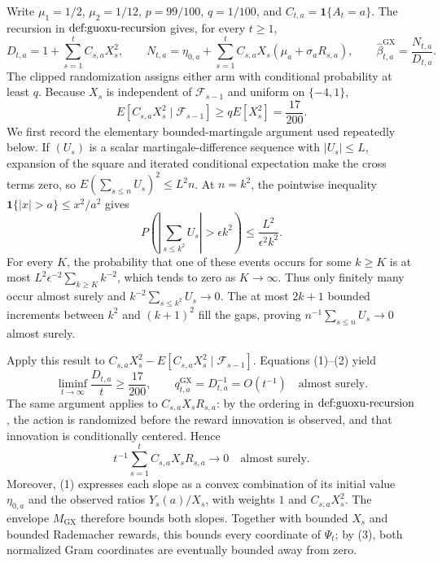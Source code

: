 Write \(\mu_1=1/2\), \(\mu_2=1/12\), \(p=99/100\), \(q=1/100\), and \(C_{t,a}=\mathbf 1\{A_t=a\}\).  The recursion in \(\textnormal{def:guoxu-recursion}\) gives, for every \(t\geq 1\),
\[
 D_{t,a}=1+\sum_{s=1}^t C_{s,a}X_s^2,\qquad
 N_{t,a}=\eta_{0,a}+\sum_{s=1}^t C_{s,a}X_s(\mu_a+\sigma_aR_{s,a}),\qquad
 \widehat\beta^{\mathrm{GX}}_{t,a}=\frac{N_{t,a}}{D_{t,a}}. \tag{1}
\]
The clipped randomization assigns either arm with conditional probability at least \(q\).  Because \(X_s\) is independent of \(\mathcal F_{s-1}\) and uniform on \(\{-4,1\}\),
\[
 E[C_{s,a}X_s^2\mid\mathcal F_{s-1}]
 \geq qE[X_s^2]=\frac{17}{200}. \tag{2}
\]
We first record the elementary bounded-martingale argument used repeatedly below.  If \((U_s)\) is a scalar martingale-difference sequence with \(|U_s|\leq L\), expansion of the square and iterated conditional expectation make the cross terms zero, so \(E(\sum_{s\leq n}U_s)^2\leq L^2n\).  At \(n=k^2\), the pointwise inequality \(\mathbf 1\{|x|>a\}\leq x^2/a^2\) gives
\[
 P\left(\left|\sum_{s\leq k^2}U_s\right|>\epsilon k^2\right)
 \leq \frac{L^2}{\epsilon^2k^2}.
\]
For every \(K\), the probability that one of these events occurs for some \(k\geq K\) is at most \(L^2\epsilon^{-2}\sum_{k\geq K}k^{-2}\), which tends to zero as \(K\to\infty\).  Thus only finitely many occur almost surely and \(k^{-2}\sum_{s\leq k^2}U_s\to0\).  The at most \(2k+1\) bounded increments between \(k^2\) and \((k+1)^2\) fill the gaps, proving \(n^{-1}\sum_{s\leq n}U_s\to0\) almost surely.

Apply this result to \(C_{s,a}X_s^2-E[C_{s,a}X_s^2\mid\mathcal F_{s-1}]\).  Equations (1)--(2) yield
\[
 \liminf_{t\to\infty}\frac{D_{t,a}}t\geq\frac{17}{200},
 \qquad q^{\mathrm{GX}}_{t,a}=D_{t,a}^{-1}=O(t^{-1})
 \quad\text{almost surely}. \tag{3}
\]
The same argument applies to \(C_{s,a}X_sR_{s,a}\): by the ordering in \(\textnormal{def:guoxu-recursion}\), the action is randomized before the reward innovation is observed, and that innovation is conditionally centered.  Hence
\[
 t^{-1}\sum_{s=1}^tC_{s,a}X_sR_{s,a}\longrightarrow0
 \quad\text{almost surely}. \tag{4}
\]
Moreover, (1) expresses each slope as a convex combination of its initial value \(\eta_{0,a}\) and the observed ratios \(Y_s(a)/X_s\), with weights \(1\) and \(C_{s,a}X_s^2\).  The envelope \(M_{\mathrm{GX}}\) therefore bounds both slopes.  Together with bounded \(X_s\) and bounded Rademacher rewards, this bounds every coordinate of \(\Psi_t\); by (3), both normalized Gram coordinates are eventually bounded away from zero.

